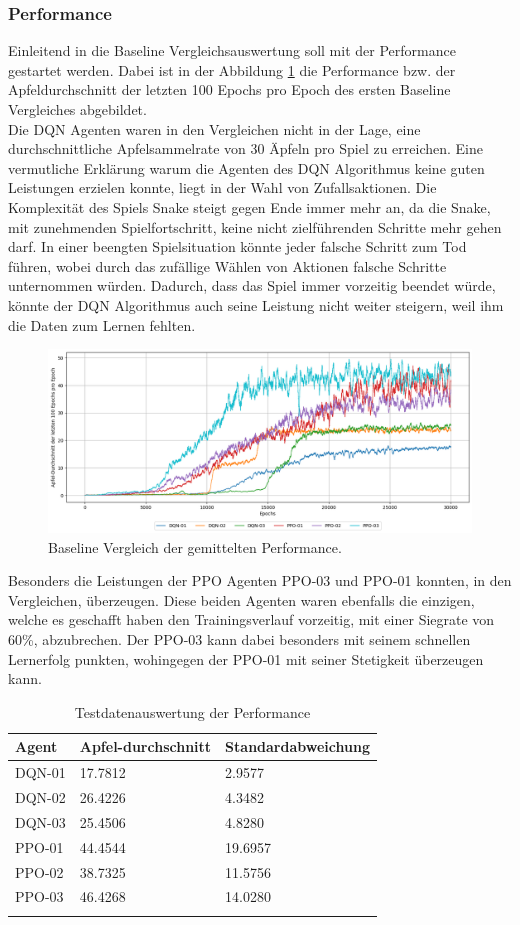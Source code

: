 \subsubsection{Performance}
Einleitend in die Baseline Vergleichsauswertung soll mit der Performance gestartet werden. Dabei ist in der Abbildung \ref{fig:Baseline_01_performance} die Performance bzw. der Apfeldurchschnitt der letzten 100 Epochs pro Epoch des ersten Baseline Vergleiches abgebildet.\\
Die DQN Agenten waren in den Vergleichen nicht in der Lage, eine durchschnittliche Apfelsammelrate von 30 Äpfeln pro Spiel zu erreichen. 
Eine vermutliche Erklärung warum die Agenten des DQN Algorithmus keine guten Leistungen erzielen konnte, liegt in der Wahl von Zufallsaktionen. Die Komplexität des Spiels Snake steigt gegen Ende immer mehr an, da die Snake, mit zunehmenden Spielfortschritt, keine nicht zielführenden Schritte mehr gehen darf. In einer beengten Spielsituation könnte jeder falsche Schritt zum Tod führen, wobei durch das zufällige Wählen von Aktionen falsche Schritte unternommen würden. Dadurch, dass das Spiel immer vorzeitig beendet würde, könnte der DQN Algorithmus auch seine Leistung nicht weiter steigern, weil ihm die Daten zum Lernen fehlten.
\begin{figure}[H]
	\centering
	\includegraphics[scale=0.4517]{Abbildungen/Evaluation/performance-rate_baseline_01.png}
	\caption[Baseline Vergleich Performance]{Baseline Vergleich der gemittelten Performance.}
	\label{fig:Baseline_01_performance}
\end{figure}
Besonders die Leistungen der PPO Agenten PPO-03 und PPO-01 konnten, in den Vergleichen, überzeugen. Diese beiden Agenten waren ebenfalls die einzigen, welche es geschafft haben den Trainingsverlauf vorzeitig, mit einer Siegrate von 60\%, abzubrechen. 
Der PPO-03 kann dabei besonders mit seinem schnellen Lernerfolg punkten, wohingegen der PPO-01 mit seiner Stetigkeit überzeugen kann.
\begin{longtable}[h]{|p{2.7cm}|p{4.5cm}|p{4cm}|}
	\hline
	Agent & Apfel-durchschnitt & Standardabweichung \\
	\hline
	DQN-01 & 17.7812 & 2.9577 \\
	\hline
	DQN-02 & 26.4226 & 4.3482 \\
	\hline
	DQN-03 & 25.4506 & 4.8280 \\
	\hline
	PPO-01 & 44.4544 & 19.6957 \\
	\hline
	PPO-02 & 38.7325 & 11.5756 \\
	\hline
	PPO-03 & 46.4268 & 14.0280 \\
	\hline
\caption{Testdatenauswertung der Performance}
\label{tab:Evaluation_Testdaten_Performance} 
\end{longtable}
